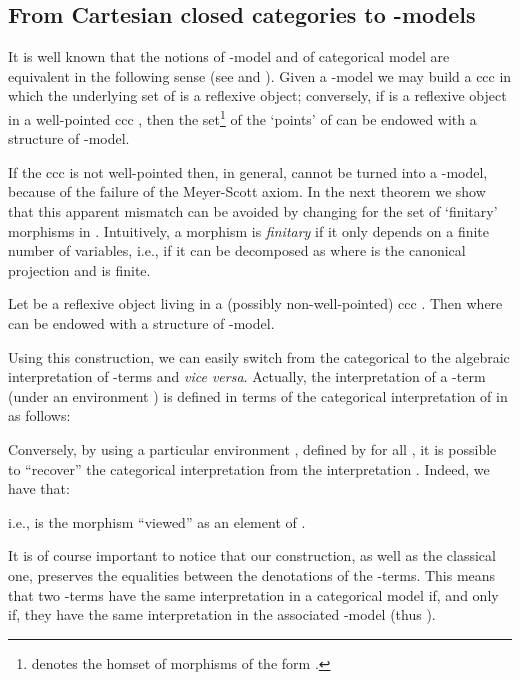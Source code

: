 \documentclass[english]{llncs}
\begin{document}
\subsection{From Cartesian closed categories to -models}

It is well known that the notions of -model and of categorical model are equivalent in the following sense (see \cite[Ch.~5]{Bare} and \cite[Sec.~9.5]{AspertiL91}).
Given a -model  we may build a ccc in which the underlying set of  is a reflexive object; 
conversely, if  is a reflexive object in a well-pointed ccc , then the set\footnote{
 denotes the homset of morphisms of the form .
}  of the `points' of  
can be endowed with a structure of -model.

If the ccc is not well-pointed then, in general,  cannot be turned into a -model, because of the failure of the Meyer-Scott axiom.
In the next theorem we show that this apparent mismatch can be avoided by changing 
for the set  of `finitary' morphisms in . 
Intuitively, a morphism  is {\em finitary} if it only depends on a finite number of variables, i.e., if it can be decomposed as 
where  is the canonical projection and  is finite. 



\begin{theorem} \cite[Thm.~2.2.12]{ManzonettoTh} Let  be a reflexive object living in a (possibly non-well-pointed) ccc . 
Then  where  can be endowed with a structure of -model.
\end{theorem}

Using this construction, we can easily switch from the categorical to the algebraic interpretation of -terms and {\em vice versa}.
Actually, the interpretation of a -term  (under an environment ) is defined in terms of the categorical interpretation 
of  in  as follows:

Conversely, by using a particular environment , defined by  for all ,
it is possible to ``recover'' the categorical interpretation 
 from the interpretation . Indeed, we have that:

i.e.,  is the morphism  ``viewed'' as an element of .

It is of course important to notice that our construction, as well as the classical one, preserves the equalities between the denotations of the -terms.
This means that two -terms have the same interpretation in a categorical model if, and only if, they have the same interpretation in the associated 
-model (thus ).
\end{document}
